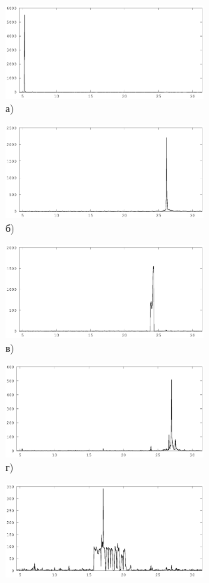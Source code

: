 \documentclass[12pt, a4paper]{article}
\begin{document}
	\begin{figure}[H]
	\centering

	\begin{subfigure}[b]{0.45 \textwidth}
		\centering
		\includegraphics[width=7.5cm]{all-freq-5-8.eps}	
		\caption*{а)}
	\end{subfigure}  
	\begin{subfigure}[b]{0.45 \textwidth}
		\centering
		\includegraphics[width=7.5cm]{all-freq-26-5.eps}	
		\caption*{б)}
	\end{subfigure}  
	\begin{subfigure}[b]{0.45 \textwidth}
		\centering
		\includegraphics[width=7.5cm]{all-freq-24-6.eps}	
		\caption*{в)}
	\end{subfigure}  
	\begin{subfigure}[b]{0.45 \textwidth}
		\centering
		\includegraphics[width=7.5cm]{all-freq-27-0-1.eps}	
		\caption*{г)}
	\end{subfigure}  
	\begin{subfigure}[b]{0.45 \textwidth}
		\centering
		\includegraphics[width=7.5cm]{all-freq-17-2-1.eps}	

\end{subfigure}
\end{figure}
\end{document}
